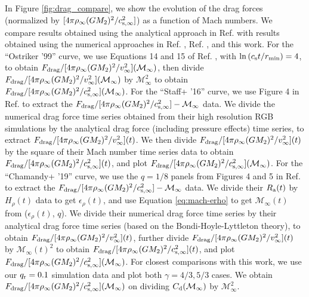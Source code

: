 In Figure \ref{fig:drag_compare}, we show the evolution of the drag forces (normalized by $[4\pi \rho_\infty (GM_2)^2/c_{\rm s, \infty}^2]$) as a function of Mach numbers. We compare results obtained using the analytical approach in Ref. \cite{1999ApJ...513..252O} with results obtained using the numerical approaches in Ref. \cite{Staff:2016}, Ref. \cite{Chamandy:2019psk}, and this work. For the ``Ostriker '99'' curve, we use Equations 14 and 15 of Ref. \cite{1999ApJ...513..252O}, with $\ln{(c_{\rm s}t/r_{\rm min})} = 4$, to obtain $F_{\rm drag}/[4\pi \rho_\infty (GM_2)^2/v_{\infty}^2] (\mathcal{M}_\infty)$, then divide $F_{\rm drag}/[4\pi \rho_\infty (GM_2)^2/v_{\infty}^2] (\mathcal{M}_\infty)$ by $\mathcal{M}_\infty^2$ to obtain $F_{\rm drag}/[4\pi \rho_\infty (GM_2)^2/c_{\rm s, \infty}^2] (\mathcal{M}_\infty)$. For the ``Staff+ '16'' curve, we use Figure 4 in Ref. \cite{Staff:2016} to extract the $F_{\rm drag}/[4\pi \rho_\infty (GM_2)^2/c_{\rm s, \infty}^2] - \mathcal{M}_\infty$ data. We divide the numerical drag force time series obtained from their high resolution RGB simulations by the analytical drag force (including pressure effects) time series, to extract  $F_{\rm drag}/[4\pi \rho_\infty (GM_2)^2/v_{\infty}^2] (t)$. We then divide $F_{\rm drag}/[4\pi \rho_\infty (GM_2)^2/v_{\infty}^2] (t)$ by the square of their Mach number time series data to obtain $F_{\rm drag}/[4\pi \rho_\infty (GM_2)^2/c_{\rm s, \infty}^2] (t)$, and plot $F_{\rm drag}/[4\pi \rho_\infty (GM_2)^2/c_{\rm s, \infty}^2] (\mathcal{M}_\infty)$. For the ``Chamandy+ '19'' curve, we use the $q = 1/8$ panels from Figures 4 and 5 in Ref. \cite{Chamandy:2019psk} to extract the $F_{\rm drag}/[4\pi \rho_\infty (GM_2)^2/c_{\rm s, \infty}^2] - \mathcal{M}_\infty$ data. We divide their $R_{\rm a} (t)$ by $H_\rho (t)$ data to get $\epsilon_\rho (t)$, and use Equation \ref{eq:mach-erho} to get $\mathcal{M}_\infty (t)$ from ($\epsilon_\rho (t)$, $q$). We divide their numerical drag force time series by their analytical drag force time series (based on the Bondi-Hoyle-Lyttleton theory), to obtain $F_{\rm drag}/[4\pi \rho_\infty (GM_2)^2/v_{\infty}^2] (t)$, further divide $F_{\rm drag}/[4\pi \rho_\infty (GM_2)^2/v_{\infty}^2] (t)$ by $\mathcal{M}_\infty (t)^2$ to obtain $F_{\rm drag}/[4\pi \rho_\infty (GM_2)^2/c_{\rm s, \infty}^2] (t)$, and plot $F_{\rm drag}/[4\pi \rho_\infty (GM_2)^2/c_{\rm s, \infty}^2] (\mathcal{M}_\infty)$. For closest comparisons with this work, we use our $q_{\rm r} = 0.1$ simulation data and plot both $\gamma = 4/3, 5/3$ cases. We obtain $F_{\rm drag}/[4\pi \rho_\infty (GM_2)^2/c_{\rm s, \infty}^2] (\mathcal{M}_\infty)$ on dividing $C_{\rm d} (\mathcal{M}_\infty)$ by $\mathcal{M}_\infty^2$. 

